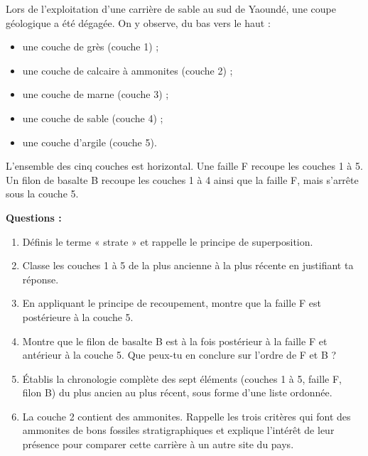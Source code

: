 \documentclass[11pt]{article}
\begin{document}
\begin{exercice}
Lors de l'exploitation d'une carrière de sable au sud de Yaoundé, une coupe géologique a été dégagée. On y observe, du bas vers le haut :
\begin{itemize}
\item une couche de grès (couche 1) ;
\item une couche de calcaire à ammonites (couche 2) ;
\item une couche de marne (couche 3) ;
\item une couche de sable (couche 4) ;
\item une couche d'argile (couche 5).
\end{itemize}
L'ensemble des cinq couches est horizontal. Une faille F recoupe les couches 1 à 5. Un filon de basalte B recoupe les couches 1 à 4 ainsi que la faille F, mais s'arrête sous la couche 5.

\textbf{Questions :}
\begin{enumerate}
\item Définis le terme « strate » et rappelle le principe de superposition.
\item Classe les couches 1 à 5 de la plus ancienne à la plus récente en justifiant ta réponse.
\item En appliquant le principe de recoupement, montre que la faille F est postérieure à la couche 5.
\item Montre que le filon de basalte B est à la fois postérieur à la faille F et antérieur à la couche 5. Que peux-tu en conclure sur l'ordre de F et B ?
\item Établis la chronologie complète des sept éléments (couches 1 à 5, faille F, filon B) du plus ancien au plus récent, sous forme d'une liste ordonnée.
\item La couche 2 contient des ammonites. Rappelle les trois critères qui font des ammonites de bons fossiles stratigraphiques et explique l'intérêt de leur présence pour comparer cette carrière à un autre site du pays.
\end{enumerate}
\end{exercice}
\end{document}
